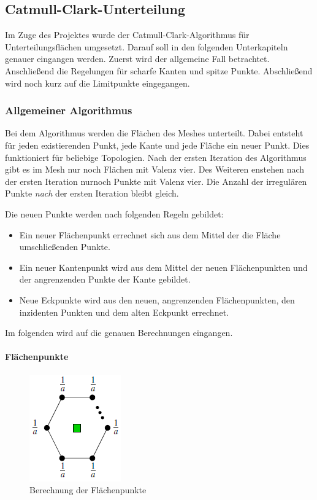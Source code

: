 \subsection{Catmull-Clark-Unterteilung}
Im Zuge des Projektes wurde der Catmull-Clark-Algorithmus für Unterteilungsflächen umgesetzt. 
Darauf soll in den folgenden Unterkapiteln genauer eingangen werden. 
Zuerst wird der allgemeine Fall betrachtet. 
Anschließend die Regelungen für scharfe Kanten und spitze Punkte. 
Abschließend wird noch kurz auf die Limitpunkte eingegangen.

\subsubsection{Allgemeiner Algorithmus}
Bei dem Algorithmus werden die Flächen des Meshes unterteilt. 
Dabei entsteht für jeden existierenden Punkt, jede Kante und jede Fläche ein neuer Punkt.
Dies funktioniert für beliebige Topologien. 
Nach der ersten Iteration des Algorithmus gibt es im Mesh nur noch Flächen mit Valenz vier.
Des Weiteren enstehen nach der ersten Iteration nurnoch Punkte mit Valenz vier. 
Die Anzahl der irregulären Punkte \emph{nach} der ersten Iteration bleibt gleich.

Die neuen Punkte werden nach folgenden Regeln gebildet:\\
\begin{itemize}
\item Ein neuer Flächenpunkt errechnet sich aus dem Mittel der die Fläche umschließenden Punkte.
\item Ein neuer Kantenpunkt wird aus dem Mittel der neuen Flächenpunkten und der angrenzenden Punkte der Kante gebildet.
\item Neue Eckpunkte wird aus den neuen, angrenzenden Flächenpunkten, den inzidenten Punkten und dem alten Eckpunkt errechnet.
\end{itemize}

Im folgenden wird auf die genauen Berechnungen eingangen.

\paragraph{Flächenpunkte}
\begin{figure}[htpb]
\centering
\includegraphics[scale=0.8]{content/pictures/facepoints.png}
\caption{Berechnung der Flächenpunkte}
\label{fig:facepoints}
\end{figure}

